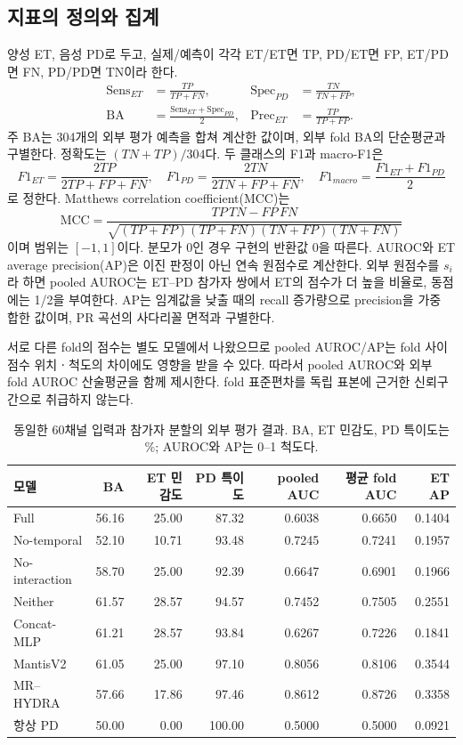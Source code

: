 \documentclass[11pt,a4paper]{article}
\DeclareMathOperator{\BA}{BA}
\numberwithin{equation}{section}
\begin{document}
\subsection{지표의 정의와 집계}
양성 ET, 음성 PD로 두고, 실제/예측이 각각 ET/ET면 TP, PD/ET면 FP,
ET/PD면 FN, PD/PD면 TN이라 한다.
\begin{align}
 \mathrm{Sens}_{ET}&=\frac{TP}{TP+FN},&
 \mathrm{Spec}_{PD}&=\frac{TN}{TN+FP},\\
 \BA&=\frac{\mathrm{Sens}_{ET}+\mathrm{Spec}_{PD}}2,&
 \mathrm{Prec}_{ET}&=\frac{TP}{TP+FP}.
\end{align}
주 BA는 304개의 외부 평가 예측을 합쳐 계산한 값이며,
외부 fold BA의 단순평균과 구별한다.
정확도는 $(TN+TP)/304$다. 두 클래스의 F1과 macro-F1은
\begin{equation}
 F1_{ET}=\frac{2TP}{2TP+FP+FN},\quad
 F1_{PD}=\frac{2TN}{2TN+FP+FN},\quad
 F1_{macro}=\frac{F1_{ET}+F1_{PD}}2
\end{equation}
로 정한다. Matthews correlation coefficient(MCC)는
\begin{equation}
 \mathrm{MCC}=\frac{TP\,TN-FP\,FN}{\sqrt{(TP+FP)(TP+FN)(TN+FP)(TN+FN)}}
\end{equation}
이며 범위는 $[-1,1]$이다. 분모가 0인 경우 구현의 반환값 0을 따른다.
AUROC와 ET average precision(AP)은 이진 판정이 아닌 연속 원점수로 계산한다.
외부 원점수를 $s_i$라 하면 pooled AUROC는 ET--PD 참가자 쌍에서
ET의 점수가 더 높을 비율로, 동점에는 1/2을 부여한다.
AP는 임계값을 낮출 때의 recall 증가량으로 precision을 가중 합한 값이며,
PR 곡선의 사다리꼴 면적과 구별한다.

서로 다른 fold의 점수는 별도 모델에서 나왔으므로 pooled AUROC/AP는
fold 사이 점수 위치ㆍ척도의 차이에도 영향을 받을 수 있다.
따라서 pooled AUROC와 외부 fold AUROC 산술평균을 함께 제시한다.
fold 표준편차를 독립 표본에 근거한 신뢰구간으로 취급하지 않는다.

\begin{table}[H]\centering\small\setlength{\tabcolsep}{4pt}
\caption{동일한 60채널 입력과 참가자 분할의 외부 평가 결과.
BA, ET 민감도, PD 특이도는 \%; AUROC와 AP는 0--1 척도다.}
\begin{tabular}{@{}lrrrrrr@{}}\toprule
 모델 & BA & ET 민감도 & PD 특이도 & pooled AUC & 평균 fold AUC & ET AP\\\midrule
Full & 56.16 & 25.00 & 87.32 & 0.6038 & 0.6650 & 0.1404 \\
No-temporal & 52.10 & 10.71 & 93.48 & 0.7245 & 0.7241 & 0.1957 \\
No-interaction & 58.70 & 25.00 & 92.39 & 0.6647 & 0.6901 & 0.1966 \\
Neither & 61.57 & 28.57 & 94.57 & 0.7452 & 0.7505 & 0.2551 \\
Concat-MLP & 61.21 & 28.57 & 93.84 & 0.6267 & 0.7226 & 0.1841 \\
MantisV2 & 61.05 & 25.00 & 97.10 & 0.8056 & 0.8106 & 0.3544 \\
MR--HYDRA & 57.66 & 17.86 & 97.46 & 0.8612 & 0.8726 & 0.3358 \\
\midrule
항상 PD & 50.00 & 0.00 & 100.00 & 0.5000 & 0.5000 & 0.0921\\\bottomrule
\end{tabular}\label{tab:primary}
\end{table}
\end{document}
